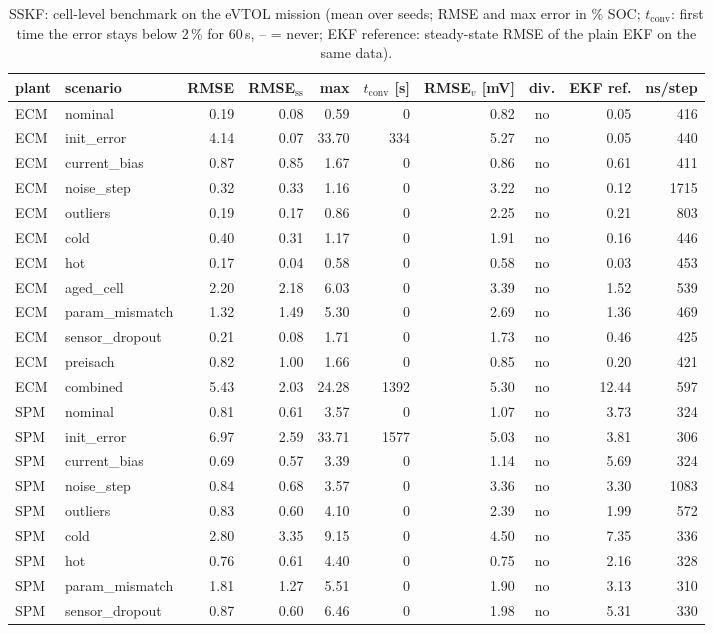 \begin{table}[H]\centering\footnotesize\setlength{\tabcolsep}{4pt}
\caption{SSKF: cell-level benchmark on the eVTOL mission (mean over seeds; RMSE and max error in \% SOC; $t_\mathrm{conv}$: first time the error stays below 2\,\% for 60\,s, -- = never; EKF reference: steady-state RMSE of the plain EKF on the same data).}\label{tab:cell_SSKF}
\begin{tabular}{llrrrrrcrr}\toprule
plant & scenario & RMSE & RMSE$_\mathrm{ss}$ & max & $t_\mathrm{conv}$ [s] & RMSE$_v$ [mV] & div. & EKF ref. & ns/step \\ \midrule
ECM & nominal & 0.19 & 0.08 & 0.59 & 0 & 0.82 & no & 0.05 & 416 \\
ECM & init\_error & 4.14 & 0.07 & 33.70 & 334 & 5.27 & no & 0.05 & 440 \\
ECM & current\_bias & 0.87 & 0.85 & 1.67 & 0 & 0.86 & no & 0.61 & 411 \\
ECM & noise\_step & 0.32 & 0.33 & 1.16 & 0 & 3.22 & no & 0.12 & 1715 \\
ECM & outliers & 0.19 & 0.17 & 0.86 & 0 & 2.25 & no & 0.21 & 803 \\
ECM & cold & 0.40 & 0.31 & 1.17 & 0 & 1.91 & no & 0.16 & 446 \\
ECM & hot & 0.17 & 0.04 & 0.58 & 0 & 0.58 & no & 0.03 & 453 \\
ECM & aged\_cell & 2.20 & 2.18 & 6.03 & 0 & 3.39 & no & 1.52 & 539 \\
ECM & param\_mismatch & 1.32 & 1.49 & 5.30 & 0 & 2.69 & no & 1.36 & 469 \\
ECM & sensor\_dropout & 0.21 & 0.08 & 1.71 & 0 & 1.73 & no & 0.46 & 425 \\
ECM & preisach & 0.82 & 1.00 & 1.66 & 0 & 0.85 & no & 0.20 & 421 \\
ECM & combined & 5.43 & 2.03 & 24.28 & 1392 & 5.30 & no & 12.44 & 597 \\
\midrule
SPM & nominal & 0.81 & 0.61 & 3.57 & 0 & 1.07 & no & 3.73 & 324 \\
SPM & init\_error & 6.97 & 2.59 & 33.71 & 1577 & 5.03 & no & 3.81 & 306 \\
SPM & current\_bias & 0.69 & 0.57 & 3.39 & 0 & 1.14 & no & 5.69 & 324 \\
SPM & noise\_step & 0.84 & 0.68 & 3.57 & 0 & 3.36 & no & 3.30 & 1083 \\
SPM & outliers & 0.83 & 0.60 & 4.10 & 0 & 2.39 & no & 1.99 & 572 \\
SPM & cold & 2.80 & 3.35 & 9.15 & 0 & 4.50 & no & 7.35 & 336 \\
SPM & hot & 0.76 & 0.61 & 4.40 & 0 & 0.75 & no & 2.16 & 328 \\
SPM & param\_mismatch & 1.81 & 1.27 & 5.51 & 0 & 1.90 & no & 3.13 & 310 \\
SPM & sensor\_dropout & 0.87 & 0.60 & 6.46 & 0 & 1.98 & no & 5.31 & 330 \\
\bottomrule\end{tabular}\end{table}

